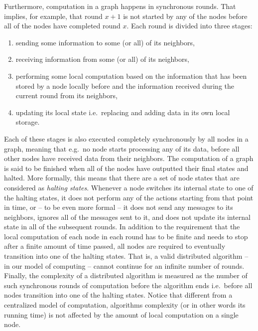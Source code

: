 Furthermore, computation in a graph happens in synchronous rounds. That implies,
for example, that round $x+1$ is not started by any of the nodes before all of the
nodes have completed round $x$. Each round is divided into three stages:

\begin{enumerate}
\item sending some information to some (or all) of its neighbors,

\item receiving information
from some (or all) of its neighbors,

\item performing some local computation based
on the information that has been stored by a node locally before and the information
received during the current round from its neighbors,

\item updating its local state i.e.\ replacing and adding data in its own local storage.
\end{enumerate}

Each of these stages is also executed
completely synchronously by all nodes in a graph, meaning that e.g.\ no node starts processing
any of its data, before all other nodes have received data from their neighbors. The computation
of a graph is said to be finished when all of the nodes have outputted their final states
and halted. More formally, this means that there are a set of node states that are
considered as \emph{halting states}. Whenever a node switches its internal state to one of the 
halting states, it does not perform any of the actions starting from that point in time, or -- to
be even more formal -- it does not send any messages to its neighbors, ignores all of the 
messages sent to it, and does not update its internal state in all of the subsequent rounds.
In addition to the requirement that the local computation of each node in each round has to be finite
and needs to stop after a finite amount of time passed, all nodes are required to eventually
transition into one of the halting states. That is, a valid distributed algorithm -- in our model of
computing -- cannot continue for an infinite number of rounds. Finally,
the complexity of a distributed algorithm is measured as the number of such synchronous rounds
of computation before the algorithm ends i.e.\ before all nodes transition into one of 
the halting states. Notice that different from a centralized model of computation,
algorithms complexity (or in other words its running time) is not affected by the
amount of local computation on a single node.

